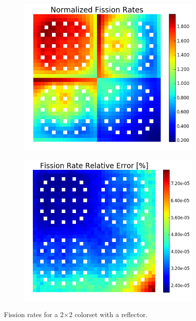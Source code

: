 \begin{figure}[h!]
\centering
\begin{subfigure}{0.5\textwidth}
  \centering
  \includegraphics[width=\linewidth]{figures/benchmarks/fission-rates/fiss-mean-reflector}
  \caption{}
  \label{fig:chap7-fiss-rate-conv}
\end{subfigure}%
\begin{subfigure}{0.5\textwidth}
  \centering
  \includegraphics[width=\linewidth]{figures/benchmarks/fission-rates/fiss-rel-err-reflector}
  \caption{}
  \label{fig:chap7-fiss-rate-conv}
\end{subfigure}%
\caption[Fission rates for a 2$\times$2 colorset with a reflector]{Fission rates for a 2$\times$2 colorset with a reflector.}
\label{fig:chap7-fiss-rates-2x2}
\end{figure}

